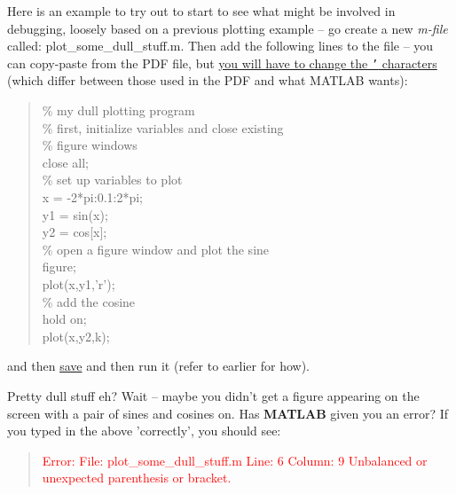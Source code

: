 \documentclass{tufte-book} %
\newenvironment{docspec}{\begin{quotation}\ttfamily\parskip0pt\parindent0pt\ignorespaces}{\end{quotation}}
\begin{document}
Here is an example to try out to start to see what might be involved in debugging,  loosely based on a previous plotting example -- go create a new \textit{m-file} called: \textsf{plot\_some\_dull\_stuff.m}. Then add the following lines to the file -- you can    copy-paste from the PDF file, but \uline{you will have to change the \texttt{'} characters} (which differ between those used in the PDF and what MATLAB wants):

\begin{docspec}
\textcolor[rgb]{0,0.501961,0}{\% my dull plotting program
\\\% first, initialize variables and close existing \\\% figure windows}
\\close \textcolor[rgb]{0.501961,0,1}{all};
\textcolor[rgb]{0,0.501961,0}{\\\% set up variables to plot} 
\\x = -2*pi:0.1:2*pi;
\\y1 = sin(x); 
\\y2 = cos[x];
\textcolor[rgb]{0,0.501961,0}{\\\% open a figure window and plot the sine }
\\figure;
\\plot(x,y1,\textcolor[rgb]{0.501961,0,1}{'r'});
\textcolor[rgb]{0,0.501961,0}{\\\% add the cosine } 
\\hold \textcolor[rgb]{0.501961,0,1}{on};
\\plot(x,y2,k);
\end{docspec} 

\noindent and then \uline{save} and then run it (refer to earlier for how).

\vspace{1mm}
Pretty dull stuff eh? Wait -- maybe you didn't get a figure appearing on the screen with a pair of sines and cosines on. Has \textbf{MATLAB} given you an error? If you typed in the above 'correctly', you should see:
\begin{docspec}
\textcolor{red}{Error: File: plot\_some\_dull\_stuff.m Line: 6 Column: 9
Unbalanced or unexpected parenthesis or bracket.}
\end{docspec}
\end{document}
